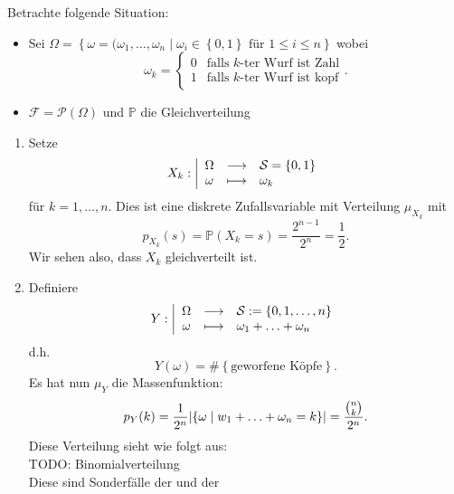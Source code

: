 \begin{example}
    Betrachte folgende Situation:
    \begin{itemize}
        \item Sei $\Omega = \left \{\omega = (\omega_1,\ldots,\omega_n \mid \omega_i \in \left \{0,1\right\} \text{ für } 1\leq i\leq n\right\}$ wobei
\[
\omega_k = \begin{cases}
    0 & \text{falls $k$-ter Wurf ist Zahl} \\
    1 & \text{falls $k$-ter Wurf ist kopf}
\end{cases}
.\] 

\item $\mathcal{F} = \mathcal{P}(\Omega)$ und $\mathbb{P}$ die Gleichverteilung
    \end{itemize}
    \begin{enumerate}[(1)]
        \item Setze
                \begin{equation*}
                X_k: \left| \begin{array}{c c l} 
                \Omega & \longrightarrow & \mathcal{S} = \left \{0,1\right\}  \\
                \omega & \longmapsto &  \omega_k
                \end{array} \right.
            \end{equation*}
            für $k = 1,\ldots,n$. Dies ist eine diskrete Zufallsvariable mit Verteilung $\mu_{X_k}$ mit
            \[
                p_{X_k}(s) = \mathbb{P}(X_k = s) = \frac{2^{n-1}}{2^n} = \frac{1}{2}
            .\] 
            Wir sehen also, dass $X_k$ gleichverteilt ist.
        \item Definiere
                \begin{equation*}
                Y: \left| \begin{array}{c c l} 
                \Omega & \longrightarrow & \mathcal{S} := \left \{0,1,\ldots,n\right\}  \\
                \omega & \longmapsto &  \omega_1 + \ldots + \omega_n
                \end{array} \right.
            \end{equation*}
            d.h.
            \[
                Y(\omega) = \# \left \{\text{geworfene Köpfe}\right\} 
            .\] 
    Es hat nun $\mu_Y$ die Massenfunktion:
    \[
        p_Y(k) = \frac{1}{2^n} \lvert\left \{\omega \mid  w_1 + \ldots + \omega_n = k\right\} \rvert = \frac{\binom{n}{k}}{2^n}
    .\] 
    Diese Verteilung sieht wie folgt aus: \\
    TODO: Binomialverteilung \\
    Diese sind Sonderfälle der  und der   
    \end{enumerate}
\end{example}

